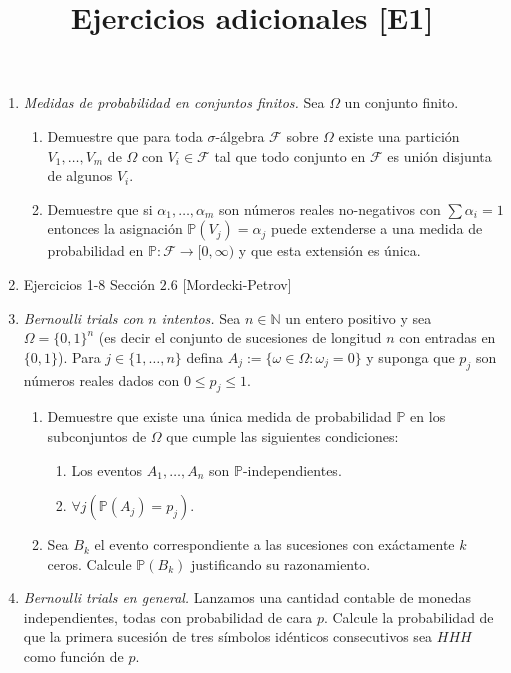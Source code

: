 \documentclass[12pt]{amsart}
\title{Ejercicios adicionales [E1]}
\theoremstyle{definition}
\renewcommand{\leq}{\leqslant}
\newcommand{\PP}{\ensuremath{\mathbb{P}}}
\newcommand{\calF}{\ensuremath{\mathcal{F}}}
\begin{document}
\maketitle

\begin{enumerate}
\item {\it Medidas de probabilidad en conjuntos finitos.} Sea $\Omega$ un conjunto finito.
\begin{enumerate}
\item Demuestre que para toda $\sigma$-\'algebra $\calF$ sobre $\Omega$ existe una partición $V_1,\dots, V_m$ de $\Omega$ con $V_i\in \calF$ tal que todo conjunto en $\calF$ es unión disjunta de algunos $V_i$.
\item Demuestre que si $\alpha_1,\dots, \alpha_m$ son números reales no-negativos con $\sum \alpha_i=1$ entonces la asignación $\PP(V_j)=\alpha_j$ puede extenderse a una medida de probabilidad en $\PP: \calF\rightarrow [0,\infty)$ y que esta extensión es única.
\end{enumerate}

\item Ejercicios 1-8 Sección  $2.6$ [Mordecki-Petrov]


\item {\it Bernoulli trials con $n$ intentos.} Sea $n\in \mathbb{N}$ un entero positivo y sea $\Omega=\{0,1\}^n$ (es decir el conjunto de sucesiones de longitud $n$ con entradas en $\{0,1\}$).
Para $j\in \{1,\dots, n\}$ defina $A_j:=\{\omega\in \Omega: \omega_j=0\}$ y suponga que $p_j$ son números reales dados con $0\leq p_j\leq 1$.
\begin{enumerate}
\item Demuestre que existe una \'unica medida de probabilidad $\PP$ en los subconjuntos de $\Omega$ que cumple las siguientes condiciones:
\begin{enumerate}
\item Los eventos $A_1,\dots, A_n$ son $\PP$-independientes.
\item $\forall j\left(\PP(A_j)=p_j\right)$.
\end{enumerate}
\item Sea $B_k$ el evento correspondiente a las sucesiones con exáctamente $k$ ceros. Calcule $\PP(B_k)$ justificando su razonamiento.
\end{enumerate}

\item {\it Bernoulli trials en general.} Lanzamos una cantidad contable de monedas independientes, todas con probabilidad de cara $p$. Calcule la probabilidad de que la primera sucesión de tres símbolos idénticos consecutivos sea $HHH$ como función de $p$.


\end{enumerate}
\end{document}
